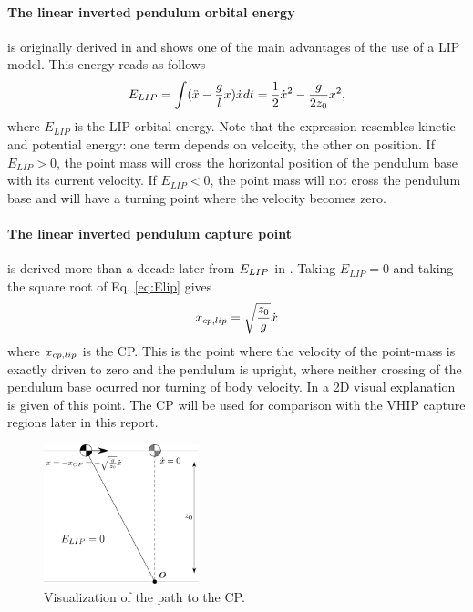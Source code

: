\paragraph{The linear inverted pendulum orbital energy}\label{subsec:liporbit} is originally derived in \cite{kajita1992dynamic} and shows one of the main advantages of the use of a \ac{LIP} model.  This energy reads as follows
\begin{equation}
E_{LIP} = \int (\ddot{x}-\frac{g}{l}x)\dot{x} dt = \frac{1}{2}\dot{x}^2-\frac{g}{2z_0}x^2,
\label{eq:Elip}
\end{equation}
where $E_{LIP}$ is the \ac{LIP} orbital energy. Note that the expression resembles kinetic and potential energy: one term depends on velocity, the other on position. If $E_{LIP}>0$, the point mass will cross the horizontal position of the pendulum base with its current velocity. If $E_{LIP}<0$, the point mass will not cross the pendulum base and will have a turning point where the velocity becomes zero.

\paragraph{The linear inverted pendulum capture point} is derived more than a decade later from $E_{LIP}$ in \cite{pratt2006capture}. Taking $E_{LIP}=0$ and taking the square root of Eq.  \eqref{eq:Elip} gives
\begin{equation}
x_{cp,lip}=\sqrt{ \frac{z_0}{g}}\dot{x} 
\label{eq:cp}
\end{equation}
where $x_{cp,lip}$ is the \ac{CP}. This is the point where the velocity of the point-mass is exactly driven to zero and the pendulum is upright, where neither crossing of the pendulum base ocurred nor turning of body velocity. In  a \ac{2D} visual explanation is given of this point. The \ac{CP} will be used for comparison with the \ac{VHIP} capture regions later in this report.
\begin{figure}
\centering
\includegraphics[width=0.4\textwidth]{STYLESTUFF/2DICP.png}
\caption{Visualization of the path to the \ac{CP}. }
\label{fig:2dicp}
\end{figure}

